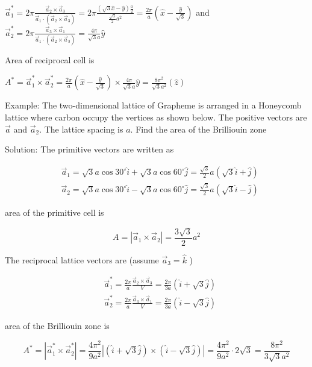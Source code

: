 $\vec{a}_{1}^{*}=2 \pi \frac{\vec{a}_{2} \times \vec{a}_{3}}{\vec{a}_{1} \cdot\left(\vec{a}_{2} \times \vec{a}_{3}\right)}=2 \pi \frac{(\sqrt{3} \hat{x}-\hat{y}) \frac{a}{2}}{\frac{\sqrt{3}}{2} a^{2}}=\frac{2 \pi}{a}\left(\hat{x}-\frac{\hat{y}}{\sqrt{3}}\right)$ and $\vec{a}_{2}^{*}=2 \pi \frac{\vec{a}_{3} \times \vec{a}_{1}}{\vec{a}_{1} \cdot\left(\vec{a}_{2} \times \vec{a}_{3}\right)}=\frac{4 \pi}{\sqrt{3} a} \hat{y}$

Area of reciprocal cell is

$A^{*}=\vec{a}_{1}^{*} \times \vec{a}_{2}^{*}=\frac{2 \pi}{a}\left(\hat{x}-\frac{\hat{y}}{\sqrt{3}}\right) \times \frac{4 \pi}{\sqrt{3} a} \hat{y}=\frac{8 \pi^{2}}{\sqrt{3} a^{2}}(\hat{z})$

Example: The two-dimensional lattice of Grapheme is arranged in a Honeycomb lattice where carbon occupy the vertices as shown below. The positive vectors are $\vec{a}$ and $\vec{a}_{2}$. The lattice spacing is $a$. Find the area of the Brilliouin zone


Solution: The primitive vectors are written as

$$
\begin{aligned}
&\vec{a}_{1}=\sqrt{3} a \cos 30^{\circ} \hat{i}+\sqrt{3} a \cos 60^{\circ} \hat{j}=\frac{\sqrt{3}}{2} a(\sqrt{3} \hat{i}+\hat{j}) \\
&\vec{a}_{2}=\sqrt{3} a \cos 30^{\circ} \hat{i}-\sqrt{3} a \cos 60^{\circ} \hat{j}=\frac{\sqrt{3}}{2} a(\sqrt{3} \hat{i}-\hat{j})
\end{aligned}
$$





area of the primitive cell is

$$
A=\left|\vec{a}_{1} \times \vec{a}_{2}\right|=\frac{3 \sqrt{3}}{2} a^{2}
$$

The reciprocal lattice vectors are (assume $\vec{a}_{3}=\hat{k}$ )

$$
\begin{aligned}
&\vec{a}_{1}^{*}=\frac{2 \pi}{a} \frac{\vec{a}_{2} \times \vec{a}_{3}}{V}=\frac{2 \pi}{3 a}(\hat{i}+\sqrt{3} \hat{j}) \\
&\vec{a}_{2}^{*}=\frac{2 \pi}{a} \frac{\vec{a}_{3} \times \vec{a}_{1}}{V}=\frac{2 \pi}{3 a}(\hat{i}-\sqrt{3} \hat{j})
\end{aligned}
$$

area of the Brilliouin zone is

$$
A^{*}=\left|\vec{a}_{1}^{*} \times \vec{a}_{2}^{*}\right|=\frac{4 \pi^{2}}{9 a^{2}}|(\hat{i}+\sqrt{3} \hat{j}) \times(\hat{i}-\sqrt{3} \hat{j})|=\frac{4 \pi^{2}}{9 a^{2}} \cdot 2 \sqrt{3}=\frac{8 \pi^{2}}{3 \sqrt{3} a^{2}}
$$


